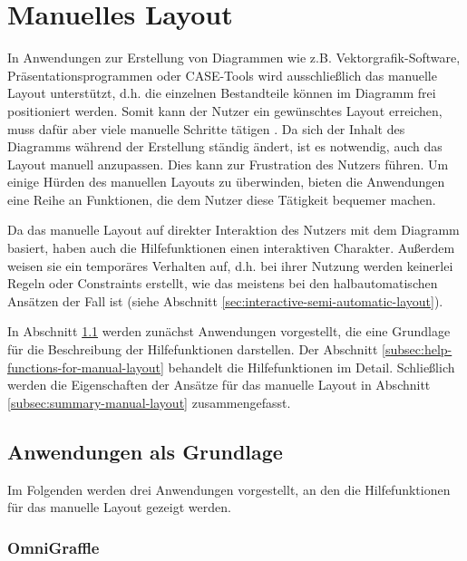 \section{Manuelles Layout}
\label{sec:manual-layout}

In Anwendungen zur Erstellung von Diagrammen wie z.B. Vektorgrafik-Software, Präsentationsprogrammen oder CASE-Tools wird ausschließlich das manuelle Layout unterstützt, d.h. die einzelnen Bestandteile können im Diagramm frei positioniert werden. Somit kann der Nutzer ein gewünschtes Layout erreichen, muss dafür aber viele manuelle Schritte tätigen \cite{Eichelberger05Aesthetics}. Da sich der Inhalt des Diagramms während der Erstellung ständig ändert, ist es notwendig, auch das Layout manuell anzupassen. Dies kann zur Frustration des Nutzers führen. Um einige Hürden des manuellen Layouts zu überwinden, bieten die Anwendungen eine Reihe an Funktionen, die dem Nutzer diese Tätigkeit bequemer machen.

Da das manuelle Layout auf direkter Interaktion des Nutzers mit dem Diagramm basiert, haben auch die Hilfefunktionen einen interaktiven Charakter. Außerdem weisen sie ein temporäres Verhalten auf, d.h. bei ihrer Nutzung werden keinerlei Regeln oder Constraints erstellt, wie das meistens bei den halbautomatischen Ansätzen der Fall ist (siehe Abschnitt \ref{sec:interactive-semi-automatic-layout}).

In Abschnitt \ref{subsec:applications-for-manual-layout} werden zunächst Anwendungen vorgestellt, die eine Grundlage für die Beschreibung der Hilfefunktionen darstellen. Der Abschnitt \ref{subsec:help-functions-for-manual-layout} behandelt die Hilfefunktionen im Detail. Schließlich werden die Eigenschaften der Ansätze für das manuelle Layout in Abschnitt \ref{subsec:summary-manual-layout} zusammengefasst.

\subsection{Anwendungen als Grundlage}
\label{subsec:applications-for-manual-layout}

Im Folgenden werden drei Anwendungen vorgestellt, an den die Hilfefunktionen für das manuelle Layout gezeigt werden.

\subsubsection{OmniGraffle}
\label{subsubsec:omnigraffle}

